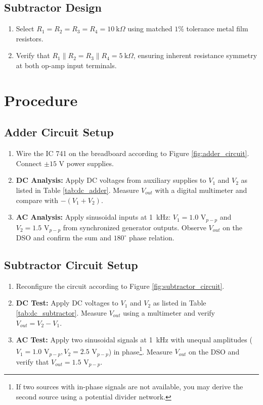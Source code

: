 \subsection{Subtractor Design}
\begin{enumerate}
	\item Select $R_1 = R_2 = R_3 = R_4 = \SI{10}{\kilo\Omega}$ using matched $1\%$ tolerance metal film resistors.
	\item Verify that $R_1 \parallel R_2 = R_3 \parallel R_4 = \SI{5}{\kilo\Omega}$, ensuring inherent resistance symmetry at both op-amp input terminals.
\end{enumerate}

\section{Procedure}
\subsection{Adder Circuit Setup}
\begin{enumerate}
	\item Wire the IC 741 on the breadboard according to Figure \ref{fig:adder_circuit}. Connect $\pm 15\text{ V}$ power supplies.
	\item \textbf{DC Analysis:} Apply DC voltages from auxiliary supplies to $V_1$ and $V_2$ as listed in Table \ref{tab:dc_adder}. Measure $V_{out}$ with a digital multimeter and compare with $-(V_1 + V_2)$.
	\item \textbf{AC Analysis:} Apply sinusoidal inputs at \SI{1}{\kilo\hertz}: $V_1 = 1.0\text{ V}_{p-p}$ and $V_2 = 1.5\text{ V}_{p-p}$ from synchronized generator outputs. Observe $V_{out}$ on the DSO and confirm the sum and $180^\circ$ phase relation.
\end{enumerate}

\subsection{Subtractor Circuit Setup}
\begin{enumerate}
	\item Reconfigure the circuit according to Figure \ref{fig:subtractor_circuit}.
	\item \textbf{DC Test:} Apply DC voltages to $V_1$ and $V_2$ as listed in Table \ref{tab:dc_subtractor}. Measure $V_{out}$ using a multimeter and verify $V_{out} = V_2 - V_1$.
	\item \textbf{AC Test:} Apply two sinusoidal signals at \SI{1}{\kilo\hertz} with unequal amplitudes ($V_1 = 1.0\text{ V}_{p-p}, V_2 = 2.5\text{ V}_{p-p}$) in phase\footnote{If two sources with in-phase signals are not available, you may derive the second source using a potential divider network.}. Measure $V_{out}$ on the DSO and verify that $V_{out} = 1.5\text{ V}_{p-p}$.
\end{enumerate}


